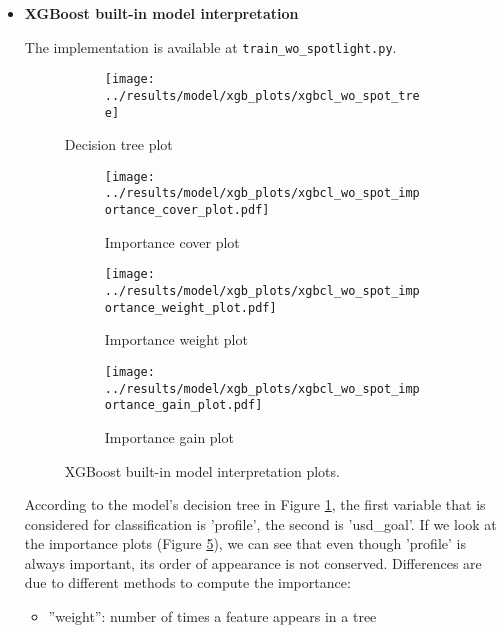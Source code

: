 \documentclass{article}
\begin{document}
\begin{itemize}
\item \textbf{XGBoost built-in model interpretation}

The implementation is available at {\tt train\_wo\_spotlight.py}.

\begin{figure}
  \begin{subfigure}{1\linewidth}
    \centering\texttt{[image: ../results/model/xgb\_plots/xgbcl\_wo\_spot\_tree]}
  \end{subfigure}
\caption{Decision tree plot}
\label{fig:tree}
\end{figure}

\begin{figure}

  \begin{subfigure}[a]{0.5\linewidth}
    \centering\texttt{[image: ../results/model/xgb\_plots/xgbcl\_wo\_spot\_importance\_cover\_plot.pdf]}
    \caption{Importance cover plot}
    \label{fig:cover}
  \end{subfigure}
 
  \begin{subfigure}[b]{0.5\linewidth}
    \centering\texttt{[image: ../results/model/xgb\_plots/xgbcl\_wo\_spot\_importance\_weight\_plot.pdf]}
    \caption{Importance weight plot}
    \label{fig:weight}
  \end{subfigure}
  
   \begin{subfigure}[c]{0.5\linewidth}
    \centering\texttt{[image: ../results/model/xgb\_plots/xgbcl\_wo\_spot\_importance\_gain\_plot.pdf]}
    \caption{Importance gain plot}
    \label{fig:gain}
  \end{subfigure}
\caption{XGBoost built-in model interpretation plots.}
\label{fig:xgb_int}
\end{figure}

According to the model's decision tree in Figure \ref{fig:tree}, the first variable that is considered for classification is 'profile', the second is 'usd\_goal'. If we look at the importance plots (Figure \ref{fig:xgb_int}), we can see that even though 'profile' is always important, its order of appearance is not conserved. Differences are due to different methods to compute the importance:
\begin{itemize}

\item ”weight”: number of times a feature appears in a tree


\end{itemize}
\end{itemize}
\end{document}

